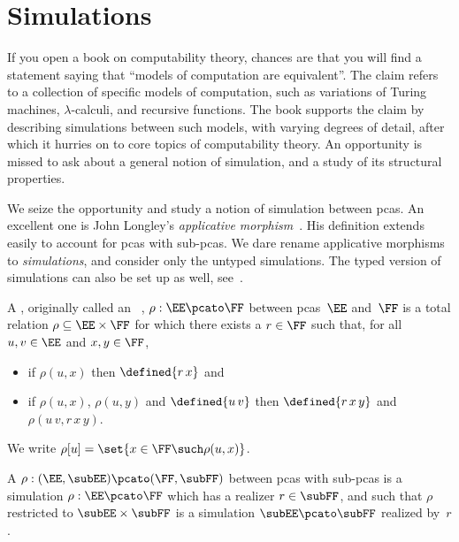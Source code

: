 \section{Simulations}
\label{sec:simulations}%

If you open a book on computability theory, chances are that you will find a statement saying that ``models of computation are equivalent''. The claim refers to a collection of specific models of computation, such as variations of Turing machines, $\lambda$-calculi, and recursive functions. The book supports the claim by describing simulations between such models, with varying degrees of detail, after which it hurries on to core topics of computability theory. An opportunity is missed to ask about a general notion of simulation, and a study of its structural properties.


We seize the opportunity and study a notion of simulation between pcas. An excellent one is John Longley's \emph{applicative morphism}~. His definition extends easily to account for pcas with sub-pcas. We dare rename applicative morphisms to \emph{simulations}, and consider only the untyped simulations. The typed version of simulations can also be set up as well, see~.

\begin{definition}
  \label{def:simulation}%
  A , originally called an ~\cite{Longley:94},
  $\rho: \EE \pcato \FF$ between pcas~$\EE$ and~$\FF$ is a total relation $\rho
  \subseteq \EE \times \FF$ for which there exists a  $r \in \FF$
  such that, for all $u, v \in \EE$ and $x, y \in \FF$,
  \begin{itemize}
  \item if $\rho(u, x)$ then $\defined{r \, x}$ and
  \item if $\rho(u, x)$, $\rho(u, y)$ and $\defined{u \, v}$ then
    $\defined{r \, x \, y}$ and $\rho(u \, v, r \, x \, y)$.
  \end{itemize}
  We write $\rho[u] = \set{x \in \FF \such \rho(u, x)}$.

  A  $\rho: (\EE, \subEE) \pcato (\FF, \subFF)$ between pcas with sub-pcas is a simulation
  $\rho : \EE \pcato \FF$ which has a realizer $r \in \subFF$, and such that $\rho$ restricted to $\subEE \times \subFF$ is a simulation $\subEE \pcato \subFF$ realized by~$r$.
\end{definition}

